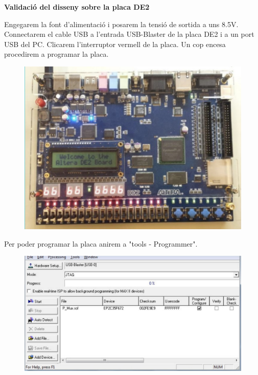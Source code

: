 \documentclass[12pt, a4papre]{article}
\begin{document}
	
	\textbf{\large{Validació del disseny sobre la placa DE2}}	
	
	Engegarem la font d’alimentació i posarem la tensió de sortida a uns 8.5V. Connectarem el cable
	USB a l’entrada USB-Blaster de la placa DE2 i a un port USB del PC.  Clicarem l’interruptor vermell de la placa.
	Un cop encesa  procedirem a programar la placa.
	
	\begin{figure}[H]
		\begin{center}
		\includegraphics[width=120mm]{placa.jpeg}
		\end{center}
	\end{figure}
	
	
	Per poder programar la placa anirem a "tools - Programmer".
	\begin{figure}[H]
		\begin{center}
		\includegraphics[width=150mm]{programacioplaca1.jpeg}
		\end{center}
	\end{figure}
	
\end{document}
